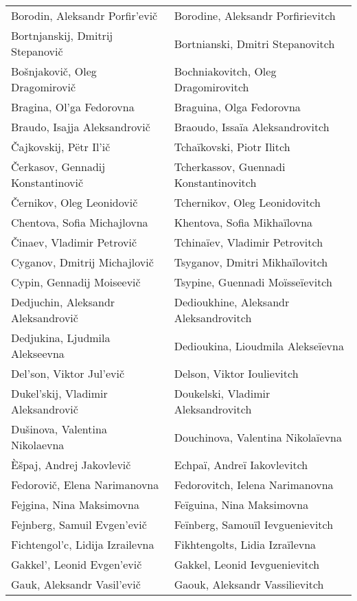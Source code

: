 {\begin{longtable}[c]{ll}
 \\
 Borodin, Aleksandr Porfir'evič
 & Borodine, Aleksandr Porfirievitch
 \\
 Bortnjanskij, Dmitrij Stepanovič
 & Bortnianski, Dmitri Stepanovitch
 \\
 Bošnjakovič, Oleg Dragomirovič
 & Bochniakovitch, Oleg Dragomirovitch
 \\
 Bragina, Ol'ga Fedorovna
 & Braguina, Olga Fedorovna
 \\
 Braudo, Isajja Aleksandrovič
 & Braoudo, Issaïa Aleksandrovitch
 \\
 Čajkovskij, Pëtr Il'ič
 & Tchaïkovski, Piotr Ilitch
 \\
 Čerkasov, Gennadij Konstantinovič
 & Tcherkassov, Guennadi Konstantinovitch
 \\
 Černikov, Oleg Leonidovič
 & Tchernikov, Oleg Leonidovitch
 \\
 Chentova, Sofia Michajlovna
 & Khentova, Sofia Mikhaïlovna
 \\
 Činaev, Vladimir Petrovič
 & Tchinaïev, Vladimir Petrovitch
 \\
 Cyganov, Dmitrij Michajlovič
 & Tsyganov, Dmitri Mikhaïlovitch
 \\
 Cypin, Gennadij Moiseevič
 & Tsypine, Guennadi Moïsseïevitch
 \\
 Dedjuchin, Aleksandr Aleksandrovič
 & Dedioukhine, Aleksandr Aleksandrovitch
 \\
 Dedjukina, Ljudmila Alekseevna
 & Dedioukina, Lioudmila Alekseïevna
 \\
 Del'son, Viktor Jul'evič
 & Delson, Viktor Ioulievitch
 \\
 Dukel'skij, Vladimir Aleksandrovič
 & Doukelski, Vladimir Aleksandrovitch
 \\
 Dušinova, Valentina Nikolaevna
 & Douchinova, Valentina Nikolaïevna
 \\
 Èšpaj, Andrej Jakovlevič
 & Echpaï, Andreï Iakovlevitch
 \\
 Fedorovič, Elena Narimanovna
 & Fedorovitch, Ielena Narimanovna
 \\
 Fejgina, Nina Maksimovna
 & Feïguina, Nina Maksimovna
 \\
 Fejnberg, Samuil Evgen'evič
 & Feïnberg, Samouïl Ievguenievitch
 \\
 Fichtengol'c, Lidija Izrailevna
 & Fikhtengolts, Lidia Izraïlevna
 \\
 Gakkel', Leonid Evgen'evič
 & Gakkel, Leonid Ievguenievitch
 \\
 Gauk, Aleksandr Vasil'evič
 & Gaouk, Aleksandr Vassilievitch

\end{longtable}}
